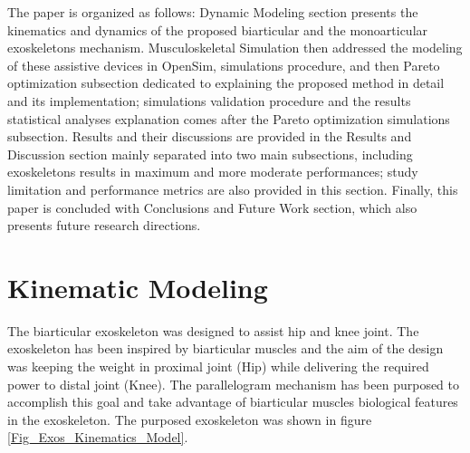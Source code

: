 \documentclass[10pt,letterpaper]{article}
\begin{document}
The paper is organized as follows: Dynamic Modeling section presents the kinematics and dynamics of the proposed biarticular and the monoarticular exoskeletons mechanism. Musculoskeletal Simulation then addressed the modeling of these assistive devices in OpenSim, simulations procedure, and then Pareto optimization subsection dedicated to explaining the proposed method in detail and its implementation; simulations validation procedure and the results statistical analyses explanation comes after the Pareto optimization simulations subsection. Results and their discussions are provided in the Results and Discussion section mainly separated into two main subsections, including exoskeletons results in maximum and more moderate performances; study limitation and performance metrics are also provided in this section. Finally, this paper is concluded with Conclusions and Future Work section, which also presents future research directions.
\section*{\textbf{Kinematic Modeling}}
The biarticular exoskeleton was designed to assist hip and knee joint. The exoskeleton has been inspired by biarticular muscles and the aim of the design was keeping the weight in proximal joint (Hip) while delivering the required power to distal joint (Knee). The parallelogram mechanism has been purposed to accomplish this goal and take advantage of biarticular muscles biological features in the exoskeleton.  The purposed exoskeleton was shown in figure \ref{Fig_Exos_Kinematics_Model}.
\end{document}
